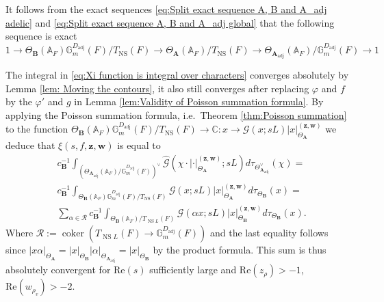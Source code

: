 \documentclass[a4paper,11pt,reqno]{amsart}
\newcommand{\C}{\mathbb{C}}
\newcommand{\G}{\mathbb{G}}
\newcommand{\A}{\mathbb{A}}
\DeclareMathOperator{\coker}{coker}
\DeclareMathOperator{\NS}{NS}
\DeclareMathOperator{\adj}{adj}
\renewcommand{\Re}{\mathrm{Re}}
\theoremstyle{definition}
\begin{document}
It follows from the exact sequences \eqref{eq:Split exact sequence A, B and A_adj adelic} and \eqref{eq:Split exact sequence A, B and A_adj global} that the following sequence is exact
\[
1 \to \Theta_{\mathbf{B}}(\A_F)\G_m^{D_{\adj}}(F)/T_{\NS}(F) \to \Theta_{\mathbf{A}}(\A_F)/T_{\NS}(F) \to \Theta_{\mathbf{A}_{\adj}}(\A_F)/\G_m^{D_{\adj}}(F) \to 1
\]

The integral in \eqref{eq:Xi function is integral over characters} converges absolutely by Lemma \ref{lem: Moving the contours}, it also still converges after replacing $\varphi$ and $f$ by the $\varphi'$ and $g$ in Lemma \ref{lem:Validity of Poisson summation formula}. By applying the Poisson summation formula, i.e.~Theorem \ref{thm:Poisson summation} to the function $\Theta_{\mathbf{B}}(\A_F)\G_m^{D_{\adj}}(F)/T_{\NS}(F) \to \C: x \to \mathcal{G}(x ; sL) |x|_{\Theta_{\mathbf{A}}}^{(\bm{z}, \bm{w})}$ we deduce that $\xi(s, f, \bm{z}, \bm{w})$ is equal to
\begin{equation}\label{eq:inverse Poisson summation}
	\begin{split}
		&c_{\mathbf{B}}^{-1}\int_{(\Theta_{\mathbf{A}_{\adj}}(\A_F)/\G_m^{D_{\adj}}(F))^{\vee}} \hat{\mathcal{G}}(\chi \cdot | \cdot|_{\Theta_{\mathbf{A}}}^{(\bm{z}, \bm{w})}; s L) d\tau_{\Theta_{\mathbf{A}_{\adj}}^{\vee}}(\chi) = \\
		&c_{\mathbf{B}}^{-1}\int_{\Theta_{\mathbf{B}}(\A_F)\G_m^{D_{\adj}}(F)/T_{\NS}(F)} \mathcal{G}(x ; sL) |x|_{\Theta_{\mathbf{A}}}^{(\bm{z}, \bm{w})}d \tau_{\Theta_{\mathbf{B}}}(x) = \\
		&\sum_{\alpha \in \mathcal{R}} c_{\mathbf{B}}^{-1} \int_{\Theta_{\mathbf{B}}(\A_F)/T_{\NS L}(F)} \mathcal{G}(\alpha x; sL) |x|_{\Theta_{\mathbf{B}}}^{(\bm{z}, \bm{w})}d \tau_{\Theta_{\mathbf{B}}}(x).
	\end{split}
\end{equation}
Where $\mathcal{R} := \coker(T_{\NS L}(F) \to \G_m^{D_{\adj}}(F))$ and the last equality follows since $|x \alpha|_{\Theta_{\mathbf{A}}} = |x|_{\Theta_{\mathbf{B}}} |\alpha|_{\Theta_{\mathbf{A}_{\adj}}} = |x|_{\Theta_{\mathbf{B}}}$ by the product formula. This sum is thus absolutely convergent for $\Re(s)$ sufficiently large and $\Re(z_{\rho}) > -1$, $\Re(w_{\rho_v}) > -2$. 
\end{document}

